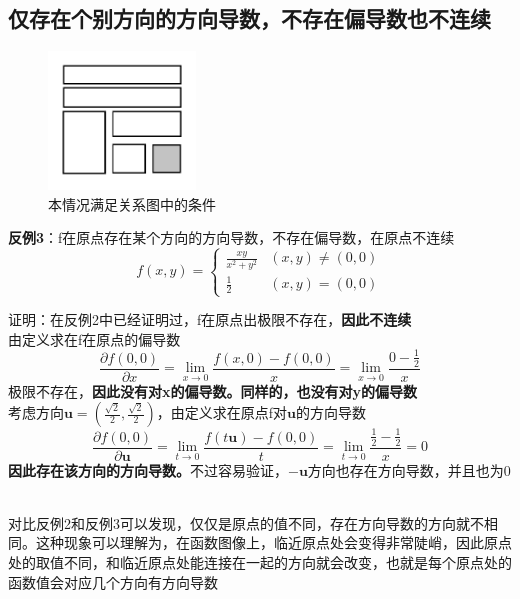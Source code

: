 \documentclass{article}
\begin{document}
\subsection{仅存在个别方向的方向导数，不存在偏导数也不连续}
\begin{figure}[!h]
    \centering
    \includegraphics[width=0.35\textwidth]{pic/04.png}
    \caption{本情况满足关系图中的条件}
\end{figure}

\textbf{反例3}：f在原点存在某个方向的方向导数，不存在偏导数，在原点不连续
\[f(x,y)= \begin{cases} \frac{xy}{x^2+y^2}   & (x,y) \neq (0,0)\\ \frac{1}{2}& (x,y) = (0,0)\end{cases}\]

证明：在反例2中已经证明过，f在原点出极限不存在，\textbf{因此不连续}\\
由定义求在f在原点的偏导数
\[\frac{\partial f(0,0)}{\partial x}=  \lim\limits_{x \rightarrow 0} \frac{f(x,0)-f(0,0)}{x} = \lim\limits_{x \rightarrow 0} \frac{0-\frac{1}{2}}{x}\]
极限不存在，\textbf{因此没有对x的偏导数。同样的，也没有对y的偏导数}\\
考虑方向$\mathbf{u}=(\frac{\sqrt{2}}{2},\frac{\sqrt{2}}{2})$，由定义求在原点f对$\mathbf{u}$的方向导数
\[\frac{\partial f(0,0)}{\partial \mathbf{u}}=  \lim\limits_{t \rightarrow 0} \frac{f(t\mathbf{u})-f(0,0)}{t} = \lim\limits_{t \rightarrow 0} \frac{\frac{1}{2}-\frac{1}{2}}{x}=0\]
\textbf{因此存在该方向的方向导数。}不过容易验证，$-\mathbf{u}$方向也存在方向导数，并且也为0

~\\

对比反例2和反例3可以发现，仅仅是原点的值不同，存在方向导数的方向就不相同。这种现象可以理解为，在函数图像上，临近原点处会变得非常陡峭，因此原点处的取值不同，和临近原点处能连接在一起的方向就会改变，也就是每个原点处的函数值会对应几个方向有方向导数

\newpage
\end{document}
